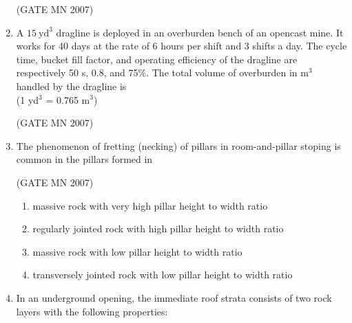 \documentclass[journal]{IEEEtran}
\begin{document}
\begin{enumerate}
\hfill (GATE MN 2007)
\begin{enumerate}
\end{enumerate}



\item A $15 \ \text{yd}^3$ dragline is deployed in an overburden bench of an opencast mine. It works for 40 days at the rate of 6 hours per shift and 3 shifts a day. The cycle time, bucket fill factor, and operating efficiency of the dragline are respectively 50 s, 0.8, and 75\%. The total volume of overburden in m$^3$ handled by the dragline is \\
(1 yd$^3$ = 0.765 m$^3$)



\hfill (GATE MN 2007)
\begin{enumerate}
\end{enumerate}



\item The phenomenon of fretting (necking) of pillars in room-and-pillar stoping is common in the pillars formed in


	\hfill (GATE MN 2007)
\begin{enumerate}
\item massive rock with very high pillar height to width ratio
\item regularly jointed rock with high pillar height to width ratio
\item massive rock with low pillar height to width ratio
\item transversely jointed rock with low pillar height to width ratio
\end{enumerate}
\item In an underground opening, the immediate roof strata consists of two rock layers with the following properties:


\end{enumerate}
\end{document}
